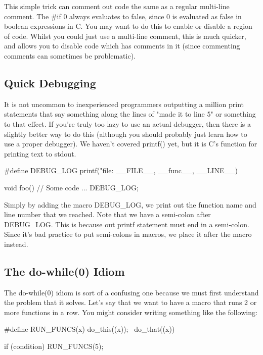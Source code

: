 \documentclass{article}
\begin{document}
This simple trick can comment out code the same as a regular multi-line comment. The \#if 0 always evaluates
to false, since 0 is evaluated as false in boolean expressions in C. You may want to do this to enable or
disable a region of code. Whilst you could just use a multi-line comment, this is much quicker, and allows you
to disable code which has comments in it (since commenting comments can sometimes be problematic).

\subsection{Quick Debugging}

It is not uncommon to inexperienced programmers outputting a million print statements that say something along
the lines of "made it to line 5" or something to that effect. If you're truly too lazy to use an actual
debugger, then there is a slightly better way to do this (although you should probably just learn how to use a
proper debugger). We haven't covered printf() yet, but it is C's function for printing text to stdout.

\begin{clst}
#define DEBUG_LOG printf("file: %
	 	 __FILE__, __func__, __LINE__)

void foo() {
    // Some code
    ...
    DEBUG_LOG;
}
\end{clst}

Simply by adding the macro DEBUG\_LOG, we print out the function name and line number that we reached. Note
that we have a semi-colon after DEBUG\_LOG. This is because out printf statement must end in a semi-colon.
Since it's bad practice to put semi-colons in macros, we place it after the macro instead.

\subsection{The do-while(0) Idiom}

The do-while(0) idiom is sort of a confusing one because we must first understand the problem that it solves.
Let's say that we want to have a macro that runs 2 or more functions in a row. You might consider writing
something like the following:

\begin{clst}
#define RUN_FUNCS(x) do_this((x)); \
		                 do_that((x))

if (condition)
    RUN_FUNCS(5);
\end{clst}
\end{document}
